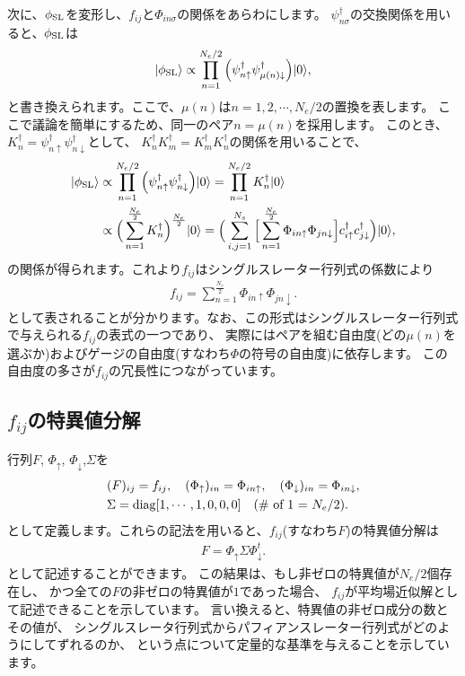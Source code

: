 次に、$\phi_{\rm SL}$を変形し、$f_{ij}$と$\Phi_{in\sigma}$の関係をあらわにします。
$\psi^{\dagger}_{n\sigma}$の交換関係を用いると、$\phi_{\rm SL}$は
\begin{align}
|\phi_{\rm SL}\rangle \propto \prod_{n=1}^{N_{e}/2}\Big(\psi_{n\uparrow}^{\dagger}\psi_{\mu(n)\downarrow}^{\dagger}\Big)|0\rangle,
\end{align}
と書き換えられます。ここで、$\mu(n)$は$n= 1, 2, \cdots, N_{e}/2$の置換を表します。
ここで議論を簡単にするため、同一のペア$n=\mu(n)$を採用します。
このとき、$K_{n}^{\dagger}=\psi_{n\uparrow}^{\dagger}\psi_{n\downarrow}^{\dagger}$として、
$K_{n}^{\dagger}K_{m}^{\dagger}=K_{m}^{\dagger}K_{n}^{\dagger}$の関係を用いることで、
\begin{align}
|\phi_{\rm SL}\rangle &\propto \prod_{n=1}^{N_{e}/2}\Big(\psi_{n\uparrow}^{\dagger}\psi_{n\downarrow}^{\dagger}\Big)|0\rangle
=\prod_{n=1}^{N_{e}/2} K_{n}^{\dagger}|0\rangle \\
&\propto\Big(\sum_{n=1}^{\frac{N_{e}}{2}}K_{n}^{\dagger}\Big)^{\frac{N_{e}}{2}} |0\rangle
=\Big(\sum_{i,j=1}^{N_{s}}\Big[\sum_{n=1}^{\frac{N_{e}}{2}}\Phi_{in\uparrow}\Phi_{jn\downarrow}\Big]
c_{i\uparrow}^{\dagger}c_{j\downarrow}^{\dagger}\Big)|0\rangle,
\end{align}
の関係が得られます。これより$f_{ij}$はシングルスレーター行列式の係数により
\begin{align}
f_{ij}=\sum_{n=1}^{\frac{N_{e}}{2}}\Phi_{in\uparrow}\Phi_{jn\downarrow}.
\end{align}
として表されることが分かります。なお、この形式はシングルスレーター行列式で与えられる$f_{ij}$の表式の一つであり、
実際にはペアを組む自由度(どの$\mu(n)$を選ぶか)およびゲージの自由度(すなわち$\Phi$の符号の自由度)に依存します。
この自由度の多さが$f_{ij}$の冗長性につながっています。

\subsection{$f_{ij}$の特異値分解}
行列$F$, $\Phi_{\uparrow}$, $\Phi_{\downarrow}$,$\Sigma$を
\begin{align}
&(F)_{ij}=f_{ij},~~~ 
(\Phi_{\uparrow})_{in}=\Phi_{in\uparrow},~~~ 
(\Phi_{\downarrow})_{in}=\Phi_{in\downarrow}, \\
&\Sigma={\rm diag}[1,\cdots,1,0,0,0]~~~\text{({\rm \# of 1} = $N_{e}/2$)}.
\end{align}
として定義します。これらの記法を用いると、$f_{ij}$(すなわち$F$)の特異値分解は
\begin{align}
F=\Phi_{\uparrow}\Sigma\Phi_{\downarrow}^{t}.
\end{align}
として記述することができます。
この結果は、もし非ゼロの特異値が$N_{e}/2$個存在し、
かつ全ての$F$の非ゼロの特異値が$1$であった場合、
$f_{ij}$が平均場近似解として記述できることを示しています。
言い換えると、特異値の非ゼロ成分の数とその値が、
シングルスレータ行列式からパフィアンスレーター行列式がどのようにしてずれるのか、
という点について定量的な基準を与えることを示しています。


